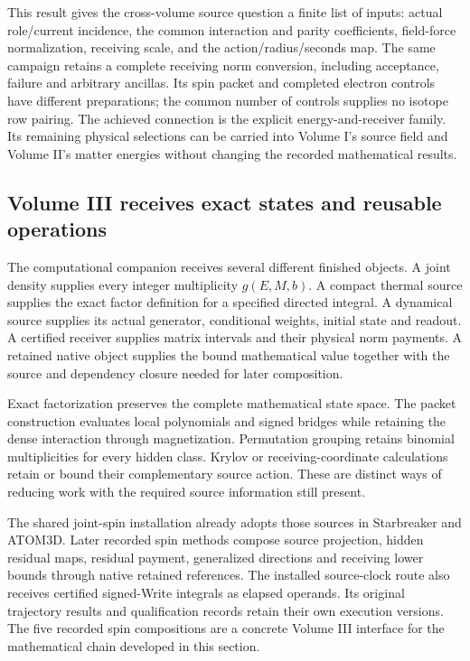 This result gives the cross-volume source question a finite list of inputs: actual role/current incidence, the common interaction and parity coefficients, field-force normalization, receiving scale, and the action/radius/seconds map. The same campaign retains a complete receiving norm conversion, including acceptance, failure and arbitrary ancillas. Its spin packet and completed electron controls have different preparations; the common number of controls supplies no isotope row pairing. The achieved connection is the explicit energy-and-receiver family. Its remaining physical selections can be carried into Volume I's source field and Volume II's matter energies without changing the recorded mathematical results.

\subsection{Volume III receives exact states and reusable operations}

The computational companion receives several different finished objects. A joint density supplies every integer multiplicity $g(E,M,b)$. A compact thermal source supplies the exact factor definition for a specified directed integral. A dynamical source supplies its actual generator, conditional weights, initial state and readout. A certified receiver supplies matrix intervals and their physical norm payments. A retained native object supplies the bound mathematical value together with the source and dependency closure needed for later composition.

Exact factorization preserves the complete mathematical state space. The packet construction evaluates local polynomials and signed bridges while retaining the dense interaction through magnetization. Permutation grouping retains binomial multiplicities for every hidden class. Krylov or receiving-coordinate calculations retain or bound their complementary source action. These are distinct ways of reducing work with the required source information still present.

The shared joint-spin installation already adopts those sources in Starbreaker and ATOM3D. Later recorded spin methods compose source projection, hidden residual maps, residual payment, generalized directions and receiving lower bounds through native retained references. The installed source-clock route also receives certified signed-Write integrals as elapsed operands. Its original trajectory results and qualification records retain their own execution versions. The five recorded spin compositions are a concrete Volume III interface for the mathematical chain developed in this section.

